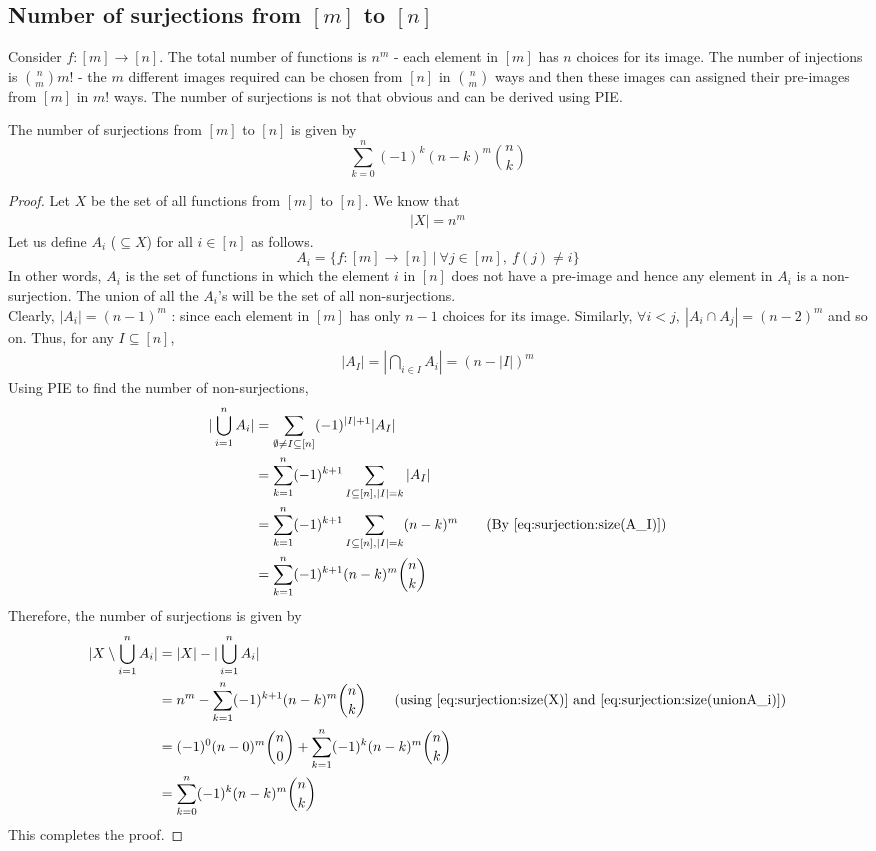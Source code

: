\subsection{Number of surjections from $[m]$ to $[n]$} \label{subsec:surjections application}
Consider $f : [m] \rightarrow [n]$. The total number of functions is $n^m$ - each element in $[m]$ has $n$ choices for its image. The number of injections is ${n \choose m}m!$ - the $m$ different images required can be chosen from $[n]$ in ${n \choose m}$ ways and then these images can assigned their pre-images from $[m]$ in $m!$ ways. The number of surjections is not that obvious and can be derived using PIE.\\
\begin{theorem}
The number of surjections from $[m]$ to $[n]$ is given by
$$\sum_{k=0}^{n} (-1)^k (n-k)^m {n \choose k}$$
\end{theorem}
\begin{proof}
Let $X$ be the set of all functions from $[m]$ to $[n]$. We know that
\begin{align}
    |X| = n^m \label{eq:surjection:size(X)}
\end{align}
Let us define $A_i$ ($\subseteq X$) for all $i\in[n]$ as follows.
$$A_i = \{f : [m] \rightarrow [n] ~|~ \forall j \in [m],~ f(j) \neq i\} $$
In other words, $A_i$ is the set of functions in which the element $i$ in $[n]$  does not have a pre-image and hence any element in $A_i$ is a non-surjection. The union of all the $A_i$'s will be the set of all non-surjections.\\
Clearly, $|A_i| = (n-1)^m$ : since each element in $[m]$ has only $n-1$ choices for its image. Similarly, $\forall i < j, ~|A_i\cap A_j| = (n-2)^m$ and so on. Thus, for any $I \subseteq [n]$,
\begin{align}
|A_I| = |\bigcap_{i \in I} A_i| = (n-|I|)^m \label{eq:surjection:size(A_I)}
\end{align}
Using PIE to find the number of non-surjections, 
\begin{align}
|\bigcup_{i=1}^{n} A_i| &= \sum_{\emptyset \neq I \subseteq [n]} (-1)^{|I| +1} |A_I|\nonumber\\
&= \sum_{k=1}^{n} (-1)^{k+1} \sum_{I \subseteq [n], |I| = k} |A_I|\nonumber\\
&= \sum_{k=1}^{n} (-1)^{k+1} \sum_{I \subseteq [n], |I| = k} (n-k)^m \nonumber\tag{By \ref{eq:surjection:size(A_I)}}\\
&= \sum_{k=1}^{n} (-1)^{k+1} (n-k)^m {n \choose k} \label{eq:surjection:size(unionA_i)}
\end{align}
Therefore, the number of surjections is given by
\begin{align*}
|X \setminus \bigcup_{i=1}^{n} A_i| &= |X| - |\bigcup_{i=1}^{n} A_i|\\
&= n^m - \sum_{k=1}^{n} (-1)^{k+1} (n-k)^m {n \choose k} \tag{using \ref{eq:surjection:size(X)} and \ref{eq:surjection:size(unionA_i)}}\\
&= (-1)^0 (n-0)^m {n \choose 0}+ \sum_{k=1}^{n} (-1)^{k} (n-k)^m {n \choose k}\\
&= \sum_{k=0}^{n} (-1)^{k} (n-k)^m {n \choose k}
\end{align*}
This completes the proof.
\end{proof}
\noindent\\
